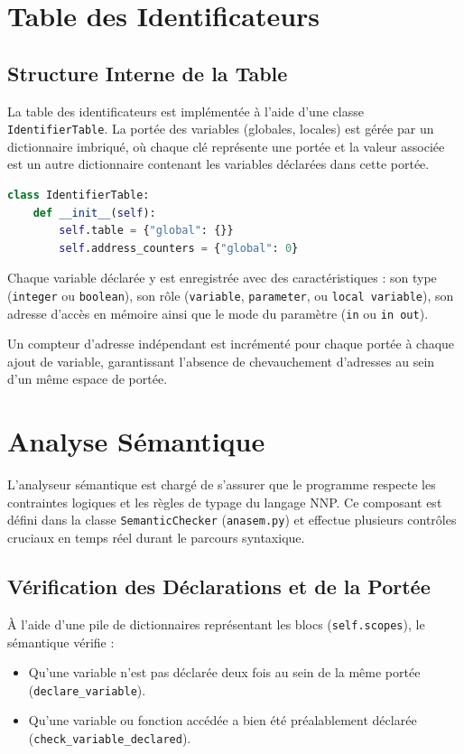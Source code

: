 \documentclass[a4paper, 12pt]{article}
\begin{document}
\newpage

\section{Table des Identificateurs}

\subsection{Structure Interne de la Table}
La table des identificateurs est implémentée à l'aide d'une classe \texttt{IdentifierTable}. La portée des variables (globales, locales) est gérée par un dictionnaire imbriqué, où chaque clé représente une portée et la valeur associée est un autre dictionnaire contenant les variables déclarées dans cette portée. 
\newline
\begin{lstlisting}[language=python, caption=Structure de base de la Table des Identificateurs]
class IdentifierTable:
    def __init__(self):
        self.table = {"global": {}}
        self.address_counters = {"global": 0}
\end{lstlisting}

Chaque variable déclarée y est enregistrée avec des caractéristiques : son type (\texttt{integer} ou \texttt{boolean}), son rôle (\texttt{variable}, \texttt{parameter}, ou \texttt{local variable}), son adresse d'accès en mémoire ainsi que le mode du paramètre (\texttt{in} ou \texttt{in out}). 

Un compteur d'adresse indépendant est incrémenté pour chaque portée à chaque ajout de variable, garantissant l'absence de chevauchement d'adresses au sein d'un même espace de portée.

\newpage

\section{Analyse Sémantique}

L'analyseur sémantique est chargé de s'assurer que le programme respecte les contraintes logiques et les règles de typage du langage NNP. Ce composant est défini dans la classe \texttt{SemanticChecker} (\texttt{anasem.py}) et effectue plusieurs contrôles cruciaux en temps réel durant le parcours syntaxique.

\subsection{Vérification des Déclarations et de la Portée}
À l'aide d'une pile de dictionnaires représentant les blocs (\texttt{self.scopes}), le sémantique vérifie :
\begin{itemize}
    \item Qu'une variable n'est pas déclarée deux fois au sein de la même portée (\texttt{declare\_variable}).
    \item Qu'une variable ou fonction accédée a bien été préalablement déclarée (\texttt{check\_}\allowbreak\texttt{variable\_}\allowbreak\texttt{declared}).
\end{itemize}
\end{document}
